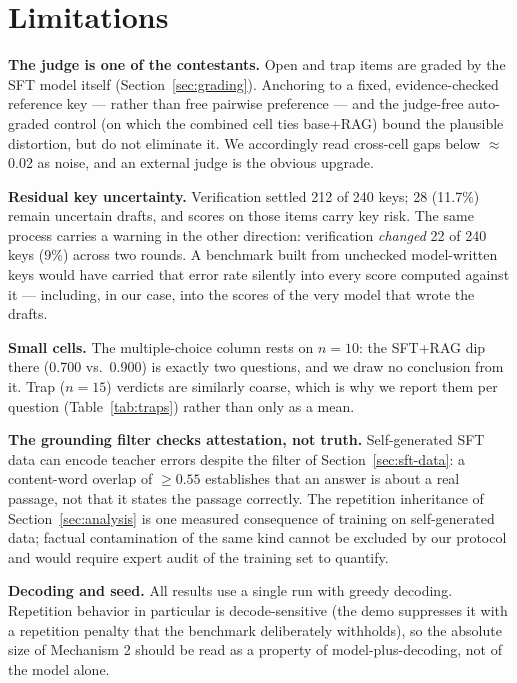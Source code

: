 \documentclass[11pt]{article}
\begin{document}
\section{Limitations}
\label{sec:limitations}

\textbf{The judge is one of the contestants.} Open and trap items are
graded by the SFT model itself (Section~\ref{sec:grading}). Anchoring to
a fixed, evidence-checked reference key --- rather than free pairwise
preference --- and the judge-free auto-graded control (on which the
combined cell ties base+RAG) bound the plausible distortion, but do not
eliminate it. We accordingly read cross-cell gaps below $\approx$0.02 as
noise, and an external judge is the obvious upgrade.

\textbf{Residual key uncertainty.} Verification settled 212 of 240 keys;
28 (11.7\%) remain uncertain drafts, and scores on those items carry key
risk. The same process carries a warning in the other direction:
verification \emph{changed} 22 of 240 keys (9\%) across two rounds. A
benchmark built from unchecked model-written keys would have carried that
error rate silently into every score computed against it --- including,
in our case, into the scores of the very model that wrote the drafts.

\textbf{Small cells.} The multiple-choice column rests on $n=10$: the
SFT+RAG dip there (0.700 vs.\ 0.900) is exactly two questions, and we draw
no conclusion from it. Trap ($n=15$) verdicts are similarly coarse, which
is why we report them per question (Table~\ref{tab:traps}) rather than
only as a mean.

\textbf{The grounding filter checks attestation, not truth.}
Self-generated SFT data can encode teacher errors despite the filter of
Section~\ref{sec:sft-data}: a content-word overlap of $\geq 0.55$
establishes that an answer is about a real passage, not that it states
the passage correctly. The repetition inheritance of
Section~\ref{sec:analysis} is one measured consequence of training on
self-generated data; factual contamination of the same kind cannot be
excluded by our protocol and would require expert audit of the training
set to quantify.

\textbf{Decoding and seed.} All results use a single run with greedy
decoding. Repetition behavior in particular is decode-sensitive (the demo
suppresses it with a repetition penalty that the benchmark deliberately
withholds), so the absolute size of Mechanism 2 should be read as a
property of model-plus-decoding, not of the model alone.
\end{document}
